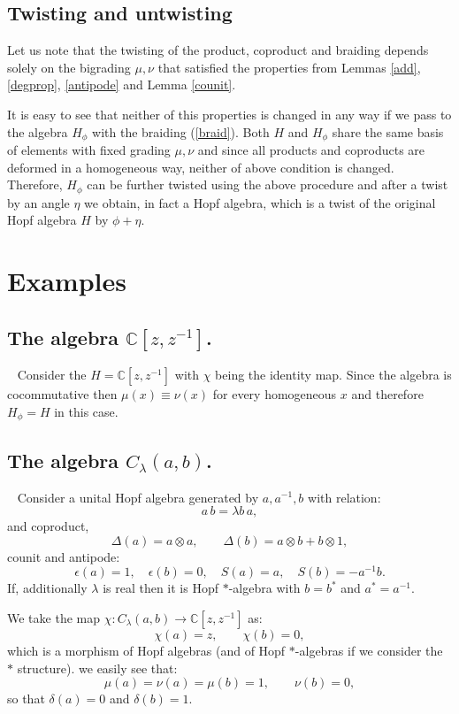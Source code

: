 \documentclass[12pt]{amsart}
\theoremstyle{definition}
\numberwithin{equation}{section}
\renewcommand{\a}{\chi}             %
\newcommand{\C}{\mathbb{C}}         %
\begin{document}
\subsection{Twisting and untwisting}

Let us note that the twisting of the product, coproduct and braiding depends 
solely on the bigrading $\mu,\nu$ that satisfied the properties from Lemmas 
\ref{add},\ref{degprop}, \ref{antipode} and Lemma \ref{counit}.

It is easy to see that neither of this properties is changed in any way if we pass to the 
algebra $H_\phi$ with the braiding (\ref{braid}). Both $H$ and $H_\phi$ share the same basis of elements
with fixed grading $\mu,\nu$ and since all products and coproducts are deformed in a 
homogeneous way, neither of above condition is changed. Therefore, $H_\phi$ can 
be further twisted using the above procedure and after a twist by an angle $\eta$
we obtain, in fact a Hopf algebra, which is a twist of the original Hopf algebra $H$ by 
$\phi+\eta$.
\section{Examples}

\subsection{The algebra $\C[z,z^{-1}]$.}\ \newline
Consider the $H=\C[z,z^{-1}]$ with $\a$ being the identity map. Since the algebra is cocommutative
then $\mu(x) \equiv \nu(x)$ for every homogeneous $x$ and therefore $H_\phi=H$ in this case.

\subsection{The algebra $C_\lambda(a,b)$.}\ \newline
Consider a unital Hopf algebra generated by $a,a^{-1},b$ with relation:
$$ a\, b = \lambda b \, a, $$
and coproduct,
$$ \Delta(a) =a \otimes a, \qquad \Delta(b) = a \otimes b + b \otimes 1, $$
counit and antipode:
$$ \epsilon(a)=1, \quad \epsilon(b)=0, \quad S(a)=a, \quad S(b) = -a^{-1} b. $$
If, additionally $\lambda$ is real then it is Hopf $\ast$-algebra with $b=b^*$ and
$a^* = a^{-1}$.

We take the map $\a: C_\lambda(a,b) \to \C[z,z^{-1}]$ as:
 $$ \a(a) =z, \qquad \a(b)=0, $$
which is a morphism of Hopf algebras (and of Hopf $\ast$-algebras if we
consider the $\ast$ structure). we easily see that:
$$ \mu(a) = \nu(a) = \mu(b) = 1, \qquad \nu(b) = 0, $$
so that $\delta(a) =0$ and $\delta(b) = 1$. 
\end{document}
